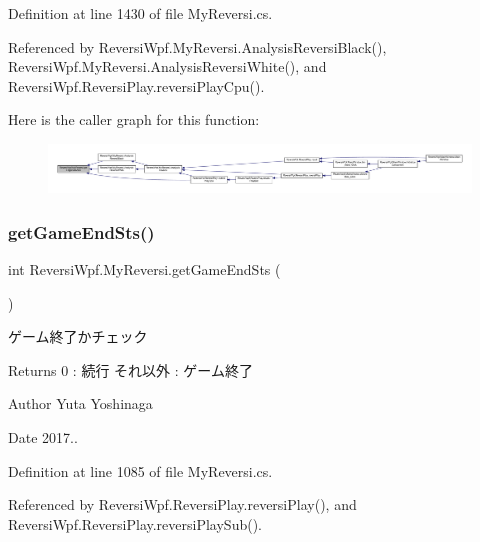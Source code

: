 Definition at line 1430 of file My\+Reversi.\+cs.



Referenced by Reversi\+Wpf.\+My\+Reversi.\+Analysis\+Reversi\+Black(), Reversi\+Wpf.\+My\+Reversi.\+Analysis\+Reversi\+White(), and Reversi\+Wpf.\+Reversi\+Play.\+reversi\+Play\+Cpu().

Here is the caller graph for this function\+:
\nopagebreak
\begin{figure}[H]
\begin{center}
\leavevmode
\includegraphics[width=350pt]{class_reversi_wpf_1_1_my_reversi_a3418fce34fd194987dc0efcd7aa654a4_icgraph}
\end{center}
\end{figure}
\mbox{\label{class_reversi_wpf_1_1_my_reversi_a77a81c9c08a6dadcab0dd5741de1b88b}} 
\subsubsection{\texorpdfstring{get\+Game\+End\+Sts()}{getGameEndSts()}}
{\footnotesize\ttfamily int Reversi\+Wpf.\+My\+Reversi.\+get\+Game\+End\+Sts (\begin{DoxyParamCaption}{ }\end{DoxyParamCaption})}



ゲーム終了かチェック 

\begin{DoxyReturn}{Returns}
0 \+: 続行 それ以外 \+: ゲーム終了 
\end{DoxyReturn}
\begin{DoxyAuthor}{Author}
Yuta Yoshinaga 
\end{DoxyAuthor}
\begin{DoxyDate}{Date}
2017.. 
\end{DoxyDate}


Definition at line 1085 of file My\+Reversi.\+cs.



Referenced by Reversi\+Wpf.\+Reversi\+Play.\+reversi\+Play(), and Reversi\+Wpf.\+Reversi\+Play.\+reversi\+Play\+Sub().

